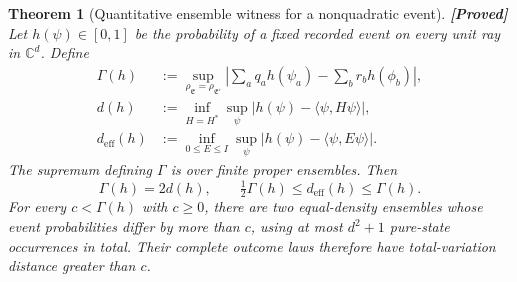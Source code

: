 \documentclass[11pt,a4paper]{article}
\newtheorem{theorem}{Theorem}[section]
\theoremstyle{definition}
\theoremstyle{remark}\newtheorem{remark}[theorem]{Remark}
\newcommand{\status}[1]{\textbf{[#1]}\quad}
\begin{document}
\begin{theorem}[Quantitative ensemble witness for a nonquadratic event]
\label{ctx:quantitativepovm}
\status{Proved}
Let $h(\psi)\in[0,1]$ be the probability of a fixed recorded event on every
unit ray in $\mathbb C^d$. Define
\begin{align*}
 \Gamma(h)&:=\sup_{\rho_{\mathfrak E}=\rho_{\mathfrak E'}}
 \left|\sum_aq_ah(\psi_a)-\sum_br_bh(\phi_b)\right|,\\
 d(h)&:=\inf_{H=H^*}\sup_\psi
 |h(\psi)-\langle\psi,H\psi\rangle|,\\
 d_{\mathrm{eff}}(h)&:=\inf_{0\le E\le I}\sup_\psi
 |h(\psi)-\langle\psi,E\psi\rangle|.
\end{align*}
The supremum defining $\Gamma$ is over finite proper ensembles. Then
\begin{equation}\label{ctx:duality}
 \Gamma(h)=2d(h),\qquad
 \tfrac12\Gamma(h)\le d_{\mathrm{eff}}(h)\le\Gamma(h).
\end{equation}
For every $c<\Gamma(h)$ with $c\ge0$, there are two equal-density
ensembles whose event probabilities differ by more than $c$, using at
most $d^2+1$ pure-state occurrences in total. Their complete outcome laws
therefore have total-variation distance greater than $c$.
\end{theorem}
\end{document}
